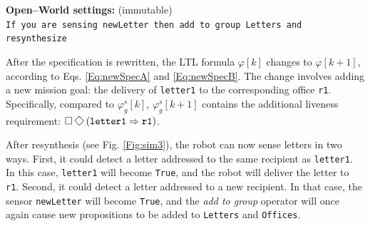 \begin{algorithm}
{%
	
	
	\textbf{Open--World settings:} (immutable)\\
	\texttt{If you are sensing newLetter then add to group Letters and resynthesize}\\
		
	}
	\vspace{-8 pt}
\end{algorithm}


After the specification is rewritten, the LTL formula $\varphi [k]$ changes to $\varphi [k+1]$, according to Eqs. \eqref{Eq:newSpecA} and \eqref{Eq:newSpecB}. The change involves adding a new mission goal: the delivery of \texttt{letter1} to the corresponding office \texttt{r1}. Specifically, compared to $\varphi_g^s [k]$, $\varphi_g^s [k+1]$ contains the additional liveness requirement:
$\G\F\left( \texttt{letter1} \Rightarrow \texttt{r1} \right)$.

After resynthesis (see Fig. \ref{Fig:sim3}), the robot can now sense letters in two ways. First, it could detect a letter addressed to the same recipient as \texttt{letter1}. In this case, \texttt{letter1} will become \texttt{True}, and the robot will deliver the letter to \texttt{r1}. Second, it could detect a letter addressed to a new recipient. In that case, the sensor \texttt{newLetter} will become \texttt{True}, and the \emph{add to group} operator will once again cause new propositions to be added to \texttt{Letters} and \texttt{Offices}.

